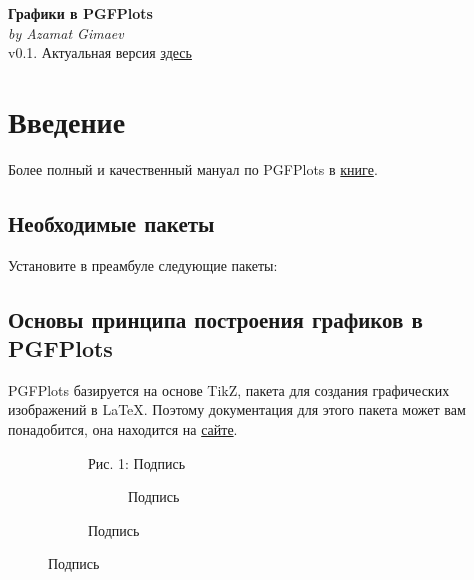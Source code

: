 \documentclass[12pt, a4paper]{article}
\def \gitref {https://github.com/gimaevazamat/Design-Plots}
\begin{document}
\begin{huge}
	\begin{center}
		\textbf{Графики в PGFPlots}\\
		\small \textit{by Azamat Gimaev} \\
		\large v0.1. Актуальная версия \href{\gitref}{здесь}
	\end{center}
\end{huge}
\section{Введение}
Более полный и качественный мануал по PGFPlots в \href{https://texdoc.org/serve/pgfplots/0}{книге}.
\subsection{Необходимые пакеты}
Установите в преамбуле следующие пакеты:
\begin{code}
	\usepackage{pgfplots}
	\pgfplotsset{compat=newest}
	\usepackage{pgfplotstable}
	\usepackage{tikz}
\end{code}
\subsection{Основы принципа построения графиков в PGFPlots}
PGFPlots базируется на основе TikZ, пакета для создания графических изображений в \LaTeX. Поэтому документация для этого пакета может вам понадобится, она находится на \href{https://texdoc.org/serve/pgfplots/0}{сайте}.
\begin{figure}[H]
\begin{subfigure}[c]{0.5\linewidth}
\centering
{}
\caption*{Рис. 1: Подпись}
\end{subfigure}
\begin{subfigure}[c]{0.5\linewidth}
\begin{code}
	\begin{figure}
	\caption{Подпись}
	\end{figure}
\end{code}
\end{subfigure}
\end{figure}
\end{document}
